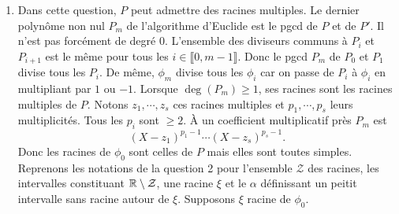 \begin{enumerate}
 \item Dans cette question, $P$ peut admettre des racines multiples. Le dernier polynôme non nul $P_m$ de l'algorithme d'Euclide est le pgcd de $P$ et de $P'$. Il n'est pas forcément de degré $0$.\newline
 L'ensemble des diviseurs communs à $P_i$ et $P_{i+1}$ est le même pour tous les $i \in \llbracket 0, m-1\rrbracket$. Donc le pgcd $P_m$ de $P_0$ et $P_1$ divise tous les $P_i$. De même, $\phi_m$ divise tous les $\phi_i$ car on passe de $P_i$ à $\phi_i$ en multipliant par $1$ ou $-1$.\newline 
Lorsque $\deg(P_m) \geq 1$, ses racines sont les racines multiples de $P$. Notons $z_1, \cdots, z_s$ ces racines multiples et $p_1, \cdots , p_s$ leurs multiplicités. Tous les $p_i$ sont $\geq 2$. \`A un coefficient multiplicatif près $P_m$ est
\[
  (X-z_1)^{p_1-1} \cdots (X-z_s)^{p_s-1}.
\]
Donc les racines de $\phi_0$ sont celles de $P$ mais elles sont toutes simples.\newline
Reprenons les notations de la question 2 pour l'ensemble $\mathcal{Z}$ des racines, les intervalles constituant $\mathbb{R} \setminus \mathcal{Z}$, une racine $\xi$ et le $\alpha$ définissant un peitit intervalle sans racine autour de $\xi$.\newline
Supposons $\xi$ racine de $\phi_0$.
\end{enumerate}

